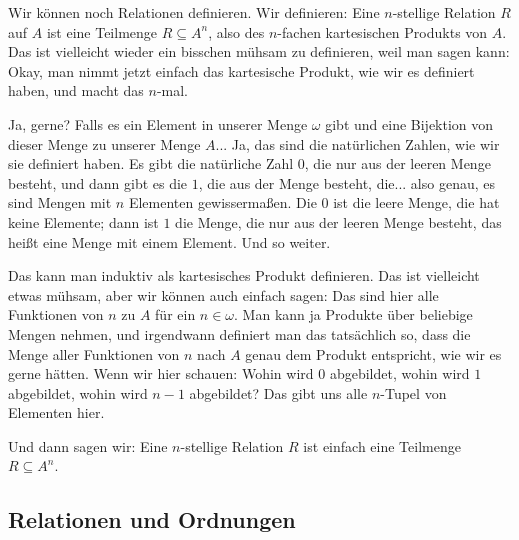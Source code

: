 \begin{spoken-clean}[01:08:36 - 01:12:54]
Wir können noch Relationen definieren. Wir definieren: Eine $n$-stellige Relation $R$ auf $A$ ist eine Teilmenge $R \subseteq A^n$, also des $n$-fachen kartesischen Produkts von $A$. Das ist vielleicht wieder ein bisschen mühsam zu definieren, weil man sagen kann: Okay, man nimmt jetzt einfach das kartesische Produkt, wie wir es definiert haben, und macht das $n$-mal.

Ja, gerne? Falls es ein Element in unserer Menge $\omega$ gibt und eine Bijektion von dieser Menge zu unserer Menge $A$... Ja, das sind die natürlichen Zahlen, wie wir sie definiert haben. Es gibt die natürliche Zahl $0$, die nur aus der leeren Menge besteht, und dann gibt es die $1$, die aus der Menge besteht, die... also genau, es sind Mengen mit $n$ Elementen gewissermaßen. Die $0$ ist die leere Menge, die hat keine Elemente; dann ist $1$ die Menge, die nur aus der leeren Menge besteht, das heißt eine Menge mit einem Element. Und so weiter.
\end{spoken-clean}

\begin{spoken-clean}[01:12:54 - 01:14:35]
Das kann man induktiv als kartesisches Produkt definieren. Das ist vielleicht etwas mühsam, aber wir können auch einfach sagen: Das sind hier alle Funktionen von $n$ zu $A$ für ein $n \in \omega$. Man kann ja Produkte über beliebige Mengen nehmen, und irgendwann definiert man das tatsächlich so, dass die Menge aller Funktionen von $n$ nach $A$ genau dem Produkt entspricht, wie wir es gerne hätten. Wenn wir hier schauen: Wohin wird $0$ abgebildet, wohin wird $1$ abgebildet, wohin wird $n-1$ abgebildet? Das gibt uns alle $n$-Tupel von Elementen hier.

Und dann sagen wir: Eine $n$-stellige Relation $R$ ist einfach eine Teilmenge $R \subseteq A^n$.
\end{spoken-clean}

\subsection{Relationen und Ordnungen}

